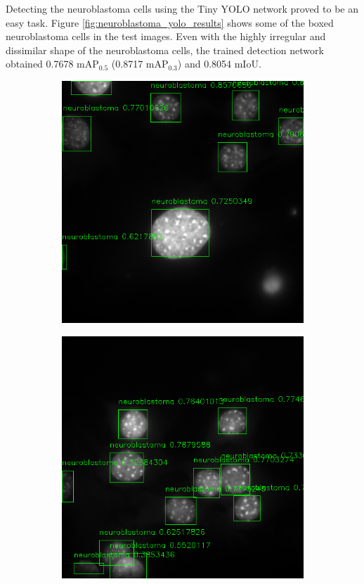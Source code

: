 \documentclass[journal]{IEEEtran}
\begin{document}
Detecting the neuroblastoma cells using the Tiny YOLO network proved to be an easy task. Figure \ref{fig:neuroblastoma_yolo_results} shows some of the boxed neuroblastoma cells in the test images.
Even with the highly irregular and dissimilar shape of the neuroblastoma cells, the trained detection network obtained 0.7678 mAP$_{0.5}$ (0.8717 mAP$_{0.3}$) and 0.8054 mIoU.

\begin{figure}
\centering
\begin{subfigure}[b]{0.9\linewidth}
\includegraphics[width=\linewidth]{c127/yolo/108636.png}
\caption{}
\end{subfigure}\vspace{2pt}
\begin{subfigure}[b]{0.9\linewidth}
\includegraphics[width=\linewidth]{c127/yolo/108641.png}

\end{subfigure}
\end{figure}
\end{document}
